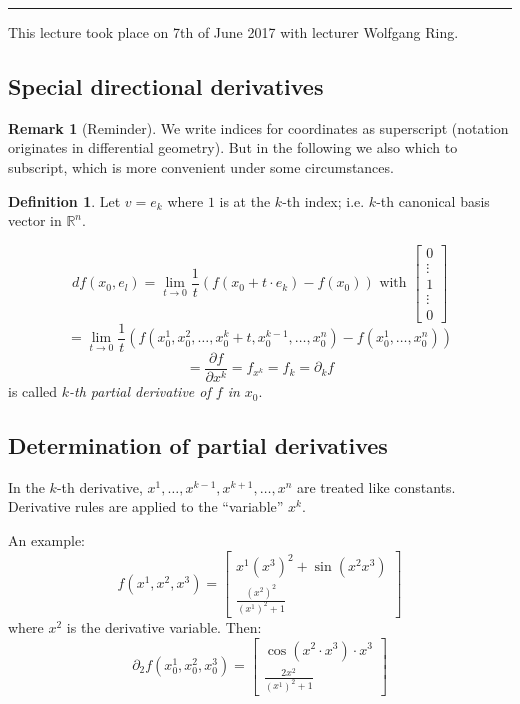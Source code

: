 \documentclass[a4paper,landscape,twocolumn]{article}
\theoremstyle{definition}
\newtheorem{defi}{Definition}
\newtheorem{rem}{Remark}
\newcommand\meta[3]{\hrule{} This #1 took place on #2 with lecturer #3.\par}
\begin{document}
\meta{lecture}{7th of June 2017}{Wolfgang Ring}

\subsection{Special directional derivatives}

\begin{rem}[Reminder]
  We write indices for coordinates as superscript
  (notation originates in differential geometry).
  But in the following we also which to subscript,
  which is more convenient under some circumstances.
\end{rem}

\begin{defi}
  Let $v = e_k$ where $1$ is at the $k$-th index;
  i.e. $k$-th canonical basis vector in $\mathbb R^n$.

  \[
    df(x_0, e_l) = \lim_{t\to 0} \frac1{t} \left(f(x_0 + t \cdot e_k) - f(x_0)\right)
    \text{ with } \begin{bmatrix} 0 \\ \vdots \\ 1 \\ \vdots \\ 0 \end{bmatrix}
  \] \[
    = \lim_{t \to 0} \frac{1}{t} \left(f(x_0^1, x_0^2, \ldots, x_0^k + t, x_0^{k-1}, \ldots, x_0^n) - f(x_0^1, \ldots, x_0^n)\right)
  \] \[
    = \frac{\partial f}{\partial x^k} = f_{x^k} = f_k = \partial_k f
  \]
  is called \emph{$k$-th partial derivative of $f$ in $x_0$}.
\end{defi}

\subsection{Determination of partial derivatives}
%
In the $k$-th derivative, $x^1, \ldots, x^{k-1}, x^{k+1}, \ldots, x^n$ are treated like constants.
Derivative rules are applied to the \enquote{variable} $x^k$.

An example:
\[
f(x^1, x^2, x^3) =
\begin{bmatrix}
  x^1 (x^3)^2 + \sin(x^2 x^3) \\
  \frac{(x^2)^2}{(x^1)^2 + 1}
\end{bmatrix}
\]
where $x^2$ is the derivative variable. Then:
\[
\partial_2 f(x_0^1, x_0^2, x_0^3) =
\begin{bmatrix}
  \cos(x^2 \cdot x^3) \cdot x^3 \\
  \frac{2x^2}{(x^1)^2 + 1}
\end{bmatrix}
\]
\end{document}
